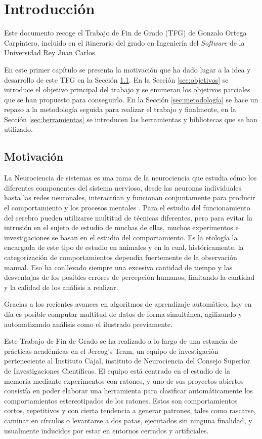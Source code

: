 \chapter{Introducción}
\setcounter{page}{1}

Este documento recoge el Trabajo de Fin de Grado (TFG) de Gonzalo Ortega Carpintero, incluido en el itinerario del grado en Ingeniería del \textit{Software} de la Universidad Rey Juan Carlos.

En este primer capítulo se presenta la motivación que ha dado lugar a la idea y desarrollo de este TFG en la Sección \ref{sec:motivacion}. En la Sección \ref{sec:objetivos} se introduce el objetivo principal del trabajo y se enumeran los objetivos parciales que se han propuesto para conseguirlo. En la Sección \ref{sec:metodología} se hace un repaso a la metodología seguida para realizar el trabajo y finalmente, en la Sección \ref{sec:herramientas} se introducen las herramientas y bibliotecas que se han utilizado.

\section{Motivación} \label{sec:motivacion}

La Neurociencia de sistemas es una rama de la neurociencia que estudia cómo los diferentes componentes del sistema nervioso, desde las neuronas individuales hasta las redes neuronales, interactúan y funcionan conjuntamente para producir el comportamiento y los procesos mentales \cite{theoretical-neuro}. Para el estudio del funcionamiento del cerebro pueden utilizarse multitud de técnicas diferentes, pero para evitar la intrusión en el sujeto de estudio de muchas de ellas, muchos experimentos e investigaciones se basan en el estudio del comportamiento. Es la etología la encargada de este tipo de estudio en animales y en la cual, históricamente, la categorización de comportamientos dependía fuertemente de la observación manual. Eso ha conllevado siempre una excesiva cantidad de tiempo y las desventajas de los posibles errores de percepción humanos, limitando la cantidad y la calidad de los análisis a realizar.

Gracias a los recientes avances en algoritmos de aprendizaje automático, hoy en día es posible computar multitud de datos de forma simultánea, agilizando y automatizando análisis como el ilustrado previamente.

Este Trabajo de Fin de Grado se ha realizado a lo largo de una estancia de prácticas académicas en el Jercog's Team, un equipo de investigación perteneciente al Instituto Cajal, instituto de Neurociencia del Consejo Superior de Investigaciones Científicas. El equipo está centrado en el estudio de la memoria mediante experimentos con ratones, y uno de sus proyectos abiertos consistía en poder elaborar una herramienta para clasificar automáticamente los comportamientos estereotipados de los ratones. Estos son comportamientos cortos, repetitivos y con cierta tendencia a generar patrones, tales como rascarse, caminar en círculos o levantarse a dos patas, ejecutados sin ninguna finalidad, y usualmente inducidos por estar en entornos cerrados y artificiales.

